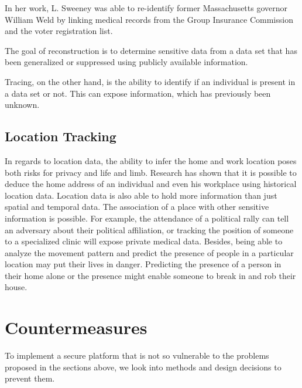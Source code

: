In her work, L. Sweeney was able to re-identify former Massachusetts governor William Weld by linking medical records from the Group Insurance Commission and the voter registration list.

 The goal of reconstruction is to determine sensitive data from a data set that has been generalized or suppressed using publicly available information. 
 
Tracing, on the other hand, is the ability to identify if an individual is present in a data set or not. This can expose information, which has previously been unknown.

\subsection{Location Tracking}
In regards to location data, the ability to infer the home and work location poses both risks for privacy and life and limb. Research has shown that it is possible to deduce the home address of an individual and even his workplace using historical location data.
Location data is also able to hold more information than just spatial and temporal data. The association of a place with other sensitive information is possible. For example, the attendance of a political rally can tell an adversary about their political affiliation, or tracking the position of someone to a specialized clinic will expose private medical data.
Besides, being able to analyze the movement pattern and predict the presence of people in a particular location may put their lives in danger. Predicting the presence of a person in their home alone or the presence might enable someone to break in and rob their house.

\section{Countermeasures}
To implement a secure platform that is not so vulnerable to the problems proposed in the sections above, we look into methods and design decisions to prevent them.
